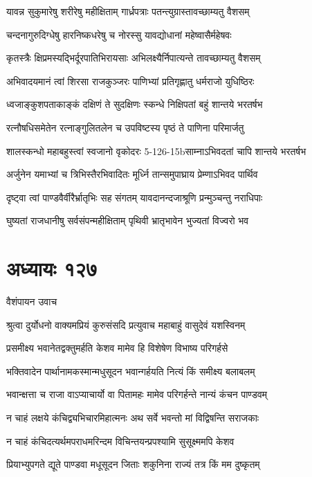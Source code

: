 \twolineshloka
{यावन्न सुकुमारेषु शरीरेषु महीक्षिताम्}
{गार्ध्रपत्राः पतन्त्युग्रास्तावच्छाम्यतु वैशसम्}


\twolineshloka
{चन्दनागुरुदिग्धेषु हारनिष्कधरेषु च}
{नोरस्सु यावद्योधानां महेष्वासैर्महेषवः}


\twolineshloka
{कृतस्त्रैः क्षिप्रमस्यद्भिर्दूरपातिभिरायसाः}
{अभिलक्ष्यैर्निपात्यन्ते तावच्छाम्यतु वैशसम्}


\twolineshloka
{अभिवादयमानं त्वां शिरसा राजकुञ्जरः}
{पाणिभ्यां प्रतिगृह्णातु धर्मराजो युधिष्ठिरः}


\twolineshloka
{ध्वजाङ्कुशपताकाङ्कं दक्षिणं ते सुदक्षिणः}
{स्कन्धे निक्षिपतां बहुं शान्तये भरतर्षभ}


\twolineshloka
{रत्नौषधिसमेतेन रत्नाङ्गुलितलेन च}
{उपविष्टस्य पृष्ठं ते पाणिना परिमार्जतु}


\twolineshloka
{शालस्कन्धो महाबहुस्त्वां स्वजानो वृकोदरः}
{5-126-15bसाम्नाऽभिवदतां चापि शान्तये भरतर्षभ}


\twolineshloka
{अर्जुनेन यमाभ्यां च त्रिभिस्तैरभिवादितः}
{मूर्ध्नि तान्समुपाघ्राय प्रेम्णाऽभिवद पार्थिव}


\twolineshloka
{दृष्ट्वा त्वां पाण्डवैर्वीरैर्भ्रातृभिः सह संगतम्}
{यावदानन्दजाश्रूणि प्रन्मुञ्चन्तु नराधिपाः}


\twolineshloka
{घुष्यतां राजधानीषु सर्वसंपन्महीक्षिताम्}
{पृथिवी भ्रातृभावेन भुज्यतां विज्वरो भव}


\chapter{अध्यायः १२७}
\twolineshloka
{वैशंपायन उवाच}
{}


\twolineshloka
{श्रुत्वा दुर्योधनो वाक्यमप्रियं कुरुसंसदि}
{प्रत्युवाच महाबाहुं वासुदेवं यशस्विनम्}


\twolineshloka
{प्रसमीक्ष्य भवानेतद्वक्तुमर्हति केशव}
{मामेव हि विशेषेण विभाष्य परिगर्हसे}


\twolineshloka
{भक्तिवादेन पार्थानामकस्मान्मधुसूदन}
{भवान्गर्हयति नित्यं किं समीक्ष्य बलाबलम्}


\twolineshloka
{भवान्क्षत्ता च राजा वाऽप्याचार्यो वा पितामहः}
{मामेव परिगर्हन्ते नान्यं कंचन पाण्डवम्}


\twolineshloka
{न चाहं लक्षये कंचिद्व्यभिचारमिहात्मनः}
{अथ सर्वे भवन्तो मां विद्विषन्ति सराजकाः}


\twolineshloka
{न चाहं कंचिदत्यर्थमपराधमरिन्दम}
{विचिन्तयन्प्रपश्यामि सुसूक्ष्ममपि केशव}


\twolineshloka
{प्रियाभ्युपगते द्यूते पाण्डवा मधूसूदन}
{जिताः शकुनिना राज्यं तत्र किं मम दुष्कृतम्}


